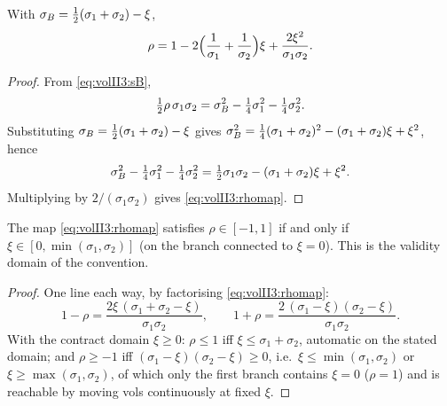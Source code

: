 \begin{proposition}\label{prop:volII3:rhomap}
With $\sigma_B = \tfrac12(\sigma_1 + \sigma_2) - \xi$,
\begin{equation}\label{eq:volII3:rhomap}
\rho = 1 - 2\Bigl(\frac{1}{\sigma_1} + \frac{1}{\sigma_2}\Bigr)\xi
     + \frac{2\xi^2}{\sigma_1\sigma_2} .
\end{equation}
\end{proposition}

\begin{proof}
From \eqref{eq:volII3:sB},
\begin{equation}\label{eq:volII3:rhostep1}
\tfrac12\rho\,\sigma_1\sigma_2 = \sigma_B^2 - \tfrac14\sigma_1^2 - \tfrac14\sigma_2^2 .
\end{equation}
Substituting $\sigma_B = \tfrac12(\sigma_1 + \sigma_2) - \xi$ gives
$\sigma_B^2 = \tfrac14(\sigma_1 + \sigma_2)^2 - (\sigma_1 + \sigma_2)\xi + \xi^2$,
hence
\begin{equation}\label{eq:volII3:rhostep2}
\sigma_B^2 - \tfrac14\sigma_1^2 - \tfrac14\sigma_2^2
= \tfrac12\sigma_1\sigma_2 - (\sigma_1 + \sigma_2)\xi + \xi^2 .
\end{equation}
Multiplying by $2/(\sigma_1\sigma_2)$ gives \eqref{eq:volII3:rhomap}.
\end{proof}

\begin{corollary}\label{cor:volII3:cvcadmiss}
The map \eqref{eq:volII3:rhomap} satisfies $\rho \in [-1, 1]$ if and only if
$\xi \in [0, \min(\sigma_1, \sigma_2)]$ (on the branch connected to $\xi = 0$).
This is the validity domain of the \stickycvc{} convention.
\end{corollary}

\begin{proof}
One line each way, by factorising \eqref{eq:volII3:rhomap}:
\begin{equation}\label{eq:volII3:rhofactor}
1 - \rho = \frac{2\xi\,(\sigma_1 + \sigma_2 - \xi)}{\sigma_1\sigma_2},
\qquad
1 + \rho = \frac{2\,(\sigma_1 - \xi)(\sigma_2 - \xi)}{\sigma_1\sigma_2}.
\end{equation}
With the contract domain $\xi \ge 0$: $\rho \le 1$ iff $\xi \le \sigma_1 +
\sigma_2$, automatic on the stated domain; and $\rho \ge -1$ iff
$(\sigma_1 - \xi)(\sigma_2 - \xi) \ge 0$, i.e.\ $\xi \le
\min(\sigma_1,\sigma_2)$ or $\xi \ge \max(\sigma_1,\sigma_2)$, of which only
the first branch contains $\xi = 0$ ($\rho = 1$) and is reachable by moving
vols continuously at fixed $\xi$.
\end{proof}

